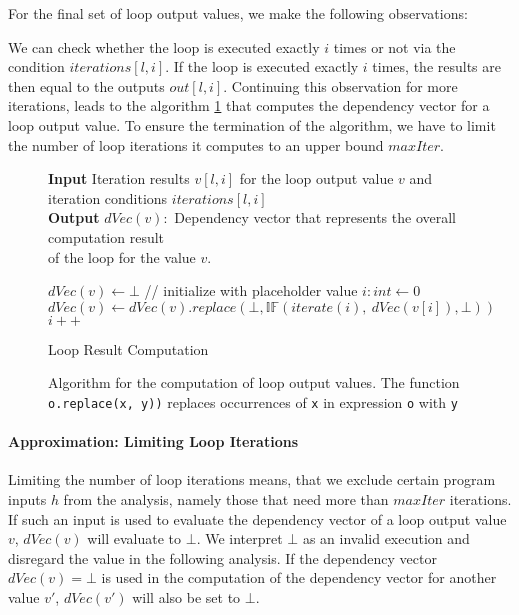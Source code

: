 For the final set of loop output values, we make the following observations:

We can check whether the loop is executed exactly $i$ times or not via the condition $iterations[l, i]$. If the loop is executed exactly $i$ times, the results are then equal to the outputs $out[l, i]$.  Continuing this observation for more iterations, leads to the algorithm \ref{alg:loop} that computes the dependency vector for a loop output value. To ensure the termination of the algorithm, we have to limit the number of loop iterations it computes to an upper bound $maxIter$.

\begin{figure}
    \centering
    \begin{algorithm}[H]
    \hspace*{\algorithmicindent} \textbf{Input} Iteration results $v[l, i]$ for the loop output value $v$ and \\
    \hspace*{\algorithmicindent} iteration conditions $iterations[l, i]$ \\
    \hspace*{\algorithmicindent} \textbf{Output} $dVec(v):$ Dependency vector that represents the overall computation result\\
    \hspace*{\algorithmicindent} \hspace*{\algorithmicindent}of the loop for the value $v$. \\
    
    \begin{algorithmic}[1]
        \State $dVec(v) \leftarrow \bot$ // initialize with placeholder value
        \State $i: int \leftarrow 0$
            \State $dVec(v) \leftarrow dVec(v).replace(\bot, \mathbb{IF}(iterate(i), \: dVec(v[i]), \bot))$
            \State $i++$
        \EndWhile
        \end{algorithmic}
\caption{Loop Result Computation}\label{alg:loop}
\end{algorithm}
    \caption{Algorithm for the computation of loop output values. The function \texttt{o.replace(x, y))} replaces occurrences of \texttt{x} in expression \texttt{o} with \texttt{y}}
\end{figure}


\paragraph{Approximation: Limiting Loop Iterations}\label{sec:approx}
Limiting the number of loop iterations means, that we exclude certain program inputs $h$ from the analysis, namely those that need more than $maxIter$ iterations. If such an input is used to evaluate the dependency vector of a loop output value $v$, $dVec(v)$ will evaluate to $\bot$. We interpret $\bot$ as an invalid execution and disregard the value in the following analysis. If the dependency vector $dVec(v) = \bot$ is used in the computation of the dependency vector for another value $v'$, $dVec(v')$ will also be set to $\bot$.

